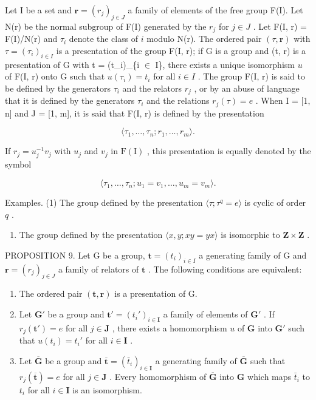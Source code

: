 Let I be a set and \(\mathbf{r} = (r_j)_{j \ensuremath{\in} J}\) a family of elements of the free group F(I). Let N(r) be the normal subgroup of F(I) generated by the \(r_j\) for \(j \ensuremath{\in} J\) . Let F(I, r) = F(I)/N(r) and \(\tau_i\) denote the class of \(i\) modulo N(r). The ordered pair \((\tau, \mathbf{r})\) with \(\tau = (\tau_i)_{i \ensuremath{\in} I}\) is a presentation of the group F(I, r); if G is a group and (t, r) is a presentation of G with t = (t\_i)\_\{i \ensuremath{\in} I\}, there exists a unique isomorphism \(u\) of F(I, r) onto G such that \(u(\tau_i) = t_i\) for all \(i \ensuremath{\in} I\) . The group F(I, r) is said to be defined by the generators \(\tau_i\) and the relators \(r_j\) , or by an abuse of language that it is defined by the generators \(\tau_i\) and the relations \(r_j(\tau) = e\) . When I = {[}1, n{]} and J = {[}1, m{]}, it is said that F(I, r) is defined by the presentation

\[
\langle \tau_ {1}, \dots , \tau_ {n}; r _ {1}, \dots , r _ {m} \rangle .
\]

If \(r_j = u_j^{-1}v_j\) with \(u_j\) and \(v_j\) in \(\mathrm{F(I)}\) , this presentation is equally denoted by the symbol

\[
\langle \tau_ {1}, \dots , \tau_ {n}; u _ {1} = v _ {1}, \dots , u _ {m} = v _ {m} \rangle .
\]

Examples. (1) The group defined by the presentation \(\langle \tau; \tau^q = e \rangle\) is cyclic of order \(q\) .

\begin{enumerate}
\def\labelenumi{(\arabic{enumi})}
\setcounter{enumi}{1}
\tightlist
\item
  The group defined by the presentation \(\langle x, y; xy = yx \rangle\) is isomorphic to \(\mathbf{Z} \times \mathbf{Z}\) .
\end{enumerate}

PROPOSITION 9. Let G be a group, \(\mathbf{t} = (t_i)_{i \in I}\) a generating family of G and \(\mathbf{r} = (r_j)_{j \in J}\) a family of relators of \(\mathbf{t}\) . The following conditions are equivalent:

\begin{enumerate}
\def\labelenumi{(\alph{enumi})}
\item
  The ordered pair \((\mathbf{t},\mathbf{r})\) is a presentation of G.
\item
  Let \(\mathbf{G}'\) be a group and \(\mathbf{t}' = (t_i')_{i \in \mathbf{I}}\) a family of elements of \(\mathbf{G}'\) . If \(r_j(\mathbf{t}') = e\) for all \(j \in \mathbf{J}\) , there exists a homomorphism \(u\) of \(\mathbf{G}\) into \(\mathbf{G}'\) such that \(u(t_i) = t_i'\) for all \(i \in \mathbf{I}\) .
\item
  Let \(\overline{\mathbf{G}}\) be a group and \(\overline{\mathbf{t}} = (\bar{t}_i)_{i\in \mathbf{I}}\) a generating family of \(\overline{\mathbf{G}}\) such that \(r_j(\overline{\mathbf{t}}) = e\) for all \(j\in \mathbf{J}\) . Every homomorphism of \(\overline{\mathbf{G}}\) into \(\mathbf{G}\) which maps \(\bar{t}_i\) to \(t_i\) for all \(i\in \mathbf{I}\) is an isomorphism.
\end{enumerate}

